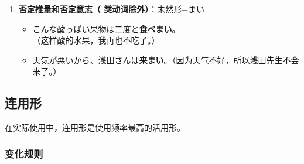 \begin{enumerate}[A]
    \uppercase\expandafter{} 类动词未然形$+$せる$+$られる$\longrightarrow$约音\footnote{原形是以す结尾时，则不发生约音。}, 动词未然形$+$される。

    \uppercase\expandafter{} 类动词未然形$+$させる$+$られる$\longrightarrow$动词未然形$+$させられる。

    \uppercase\expandafter{} 类动词未然形$+$させる$+$られる$\longrightarrow$动词未然形$+$させられる。

        \begin{itemize}
            \item {\jp 行きたくないのですが、母に病院へ{\bfseries 行かされました}}（我不想去，但是被母亲逼着，去了医院。）
            \item {\jp 子供の時は食べたくない物を沢山{\bfseries 食べさせられました}。}（小时候，有很多不想吃的东西，都被逼着吃了。）
            \item {\jp 毎日学校に{\bfseries 来させられます}が、自分でも何をしているか分かりません。}（每天被逼着上学，但是连自己都不知道在干什么。）
        \end{itemize}
    
    \vspace{0.2in}
    \item {\bfseries 否定推量和否定意志（\uppercase\expandafter{} 类动词除外）}：未然形+まい
    
    \begin{itemize}
        \item {\jp こんな酸っぱい果物は二度と{\bfseries 食べまい}。}（这样酸的水果，我再也不吃了。）
        \item {\jp 天気が悪いから、浅田さんは{\bfseries 来まい}。}（因为天气不好，所以浅田先生不会来了。）
    \end{itemize}

    \vspace{0.2in}
\end{enumerate}


\subsection{连用形}
在实际使用中，连用形是使用频率最高的活用形。

\subsubsection{变化规则}


